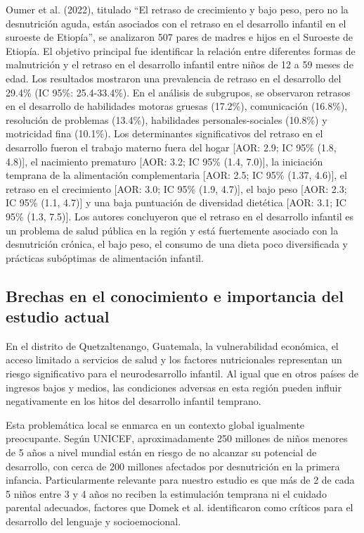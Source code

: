 \documentclass[11pt,letterpaper]{report}
\begin{document}
Oumer et al. (2022), titulado “El retraso de crecimiento y bajo peso, pero no
la desnutrición aguda, están asociados con el retraso en el desarrollo
infantil en el suroeste de Etiopía”, se analizaron 507 pares de madres e hijos
en el Suroeste de Etiopía. El objetivo principal fue identificar la relación
entre diferentes formas de malnutrición y el retraso en el desarrollo infantil
entre niños de 12 a 59 meses de edad. Los resultados mostraron una prevalencia
de retraso en el desarrollo del 29.4\% (IC 95\%: 25.4-33.4\%). En el análisis
de subgrupos, se observaron retrasos en el desarrollo de habilidades motoras
gruesas (17.2\%), comunicación (16.8\%), resolución de problemas (13.4\%),
habilidades personales-sociales (10.8\%) y motricidad fina (10.1\%).
Los determinantes significativos del retraso en el desarrollo fueron el trabajo
materno fuera del hogar [AOR: 2.9; IC 95\% (1.8, 4.8)], el nacimiento prematuro
[AOR: 3.2; IC 95\% (1.4, 7.0)], la iniciación temprana de la alimentación
complementaria [AOR: 2.5; IC 95\% (1.37, 4.6)], el retraso en el crecimiento
[AOR: 3.0; IC 95\% (1.9, 4.7)], el bajo peso [AOR: 2.3; IC 95\% (1.1, 4.7)] y
una baja puntuación de diversidad dietética [AOR: 3.1; IC 95\% (1.3, 7.5)].
Los autores concluyeron que el retraso en el desarrollo infantil es un problema
de salud pública en la región y está fuertemente asociado con la desnutrición
crónica, el bajo peso, el consumo de una dieta poco diversificada y prácticas
subóptimas de alimentación infantil.
\cite{Oumer2022}

\subsection{Brechas en el conocimiento e importancia del estudio actual}
En el distrito de Quetzaltenango, Guatemala, la vulnerabilidad económica, el
acceso limitado a servicios de salud y los factores nutricionales representan
un riesgo significativo para el neurodesarrollo infantil. Al igual que en otros
países de ingresos bajos y medios, las condiciones adversas en esta región
pueden influir negativamente en los hitos del desarrollo infantil temprano.

Esta problemática local se enmarca en un contexto global igualmente 
preocupante. Según UNICEF\cite{UNICEF2023}, aproximadamente 250 millones de 
niños menores de 5 años a nivel mundial están en riesgo de no alcanzar su 
potencial de desarrollo, con cerca de 200 millones afectados por desnutrición 
en la primera infancia. Particularmente relevante para nuestro estudio es que 
más de 2 de cada 5 niños entre 3 y 4 años no reciben la estimulación temprana 
ni el cuidado parental adecuados, factores que Domek et al.\cite{Domek2023} 
identificaron como críticos para el desarrollo del lenguaje y socioemocional. 
\end{document}
